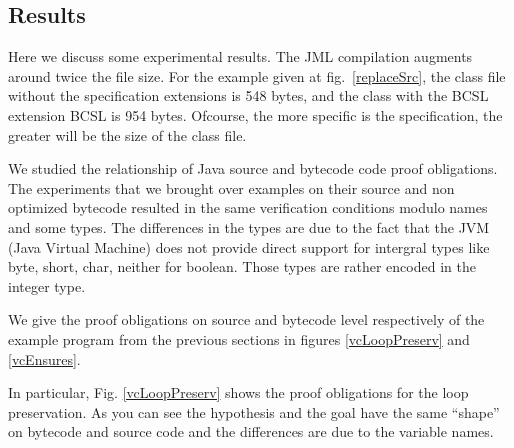 
\subsection{Results}  \label{results}

Here we discuss some experimental results. 
The JML compilation augments around twice the file size. 
For the example given at fig.~\ref{replaceSrc}, the class file without the specification extensions is 548 bytes, 
and the class with the BCSL extension BCSL is 954 bytes. Ofcourse, the more specific is the specification, the greater will be the size of the class file. 

We studied the relationship of Java source and bytecode code proof obligations. The experiments that we brought over examples on their source and
 non optimized bytecode resulted in the same verification conditions modulo names and some types. The differences in the types are due to the fact
 that the JVM (Java Virtual Machine) does not provide direct support for intergral types like byte, short, char, neither for boolean. Those types
 are rather encoded in the integer type.


We give the proof obligations on source and bytecode level respectively of the example program from the previous sections in figures \ref{vcLoopPreserv} and
\ref{vcEnsures}.   

In particular, Fig. \ref{vcLoopPreserv} shows the proof obligations for the loop preservation. As you can see the hypothesis and the goal have the same ``shape'' on bytecode and source code and the differences are due to the variable names.



